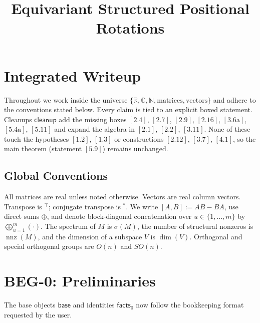 \documentclass[11pt]{article}
\title{Equivariant Structured Positional Rotations}
\author{}
\date{}
\begin{document}
\maketitle

\section*{Integrated Writeup}

Throughout we work inside the universe $\{ \mathbb{R}, \mathbb{C}, \mathbb{N}, \text{matrices}, \text{vectors} \}$ and adhere to the conventions stated below. Every claim is tied to an explicit boxed statement. Cleanups $\mathsf{cleanup}$ add the missing boxes $[2.4]$, $[2.7]$, $[2.9]$, $[2.16]$, $[3.6\mathrm{a}]$, $[5.4\mathrm{a}]$, $[5.11]$ and expand the algebra in $[2.1]$, $[2.2]$, $[3.11]$. None of these touch the hypotheses $[1.2]$, $[1.3]$ or constructions $[2.12]$, $[3.7]$, $[4.1]$, so the main theorem (statement $[5.9]$) remains unchanged.

\subsection*{Global Conventions}

All matrices are real unless noted otherwise. Vectors are real column vectors. Transpose is $^\top$; conjugate transpose is $^*$. We write $[A,B] := AB - BA$, use direct sums $\oplus$, and denote block-diagonal concatenation over $u\in\{1,\dots,m\}$ by $\bigoplus_{u=1}^m (\cdot)$. The spectrum of $M$ is $\sigma(M)$, the number of structural nonzeros is $\operatorname{nnz}(M)$, and the dimension of a subspace $V$ is $\dim(V)$. Orthogonal and special orthogonal groups are $O(n)$ and $SO(n)$.

\section{BEG-0: Preliminaries}

The base objects $\mathsf{base}$ and identities $\mathsf{facts}_0$ now follow the bookkeeping format requested by the user.
\end{document}
